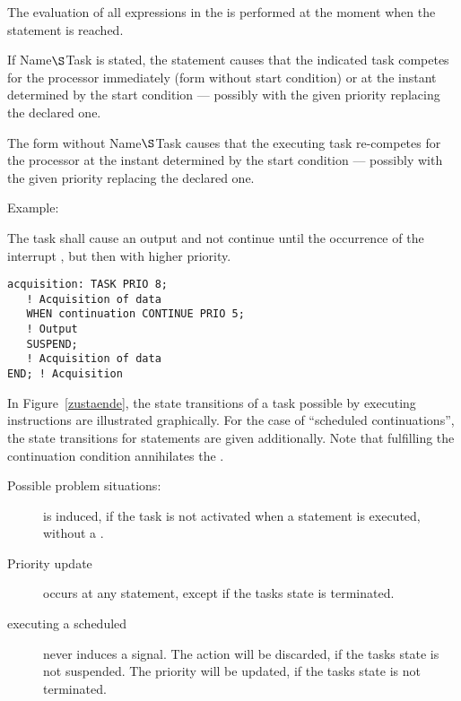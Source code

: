 \begin{grammarframe}

\end{grammarframe}

The evaluation of all expressions in the  is performed 
at the moment when the  statement is reached. 


If Name$\S $Task is stated, the statement causes that the indicated task
competes for the processor immediately (form without start condition) or
at the instant determined by the start condition --- possibly with the
given priority replacing the declared one.

The form without Name$\S $Task causes that the executing task re-competes
for the processor at the instant determined by the start condition ---
possibly with the given priority replacing the declared one.

Example:

The task  shall cause an output and not continue until
the occurrence of the interrupt , but then with higher
priority.

\begin{lstlisting}
acquisition: TASK PRIO 8;
   ! Acquisition of data
   WHEN continuation CONTINUE PRIO 5;
   ! Output
   SUSPEND;
   ! Acquisition of data
END; ! Acquisition
\end{lstlisting}

In Figure~\ref{zustaende},
the state transitions of a task possible by executing 
instructions are illustrated graphically. For the case of
``scheduled continuations'', the state transitions for 
 statements are
given additionally.
Note that fulfilling the continuation condition annihilates the
.

Possible problem situations:
\begin{description}
\item[] is induced, if the task is not activated when 
a  statement is executed, without a .
\item[Priority update] occurs at any  statement,
 except if the tasks state is terminated.
\item[executing a scheduled ] never induces a signal. The action will
   be discarded, if the tasks state is not suspended. The priority will be 
   updated, if the tasks state is not terminated.
\end{description}


